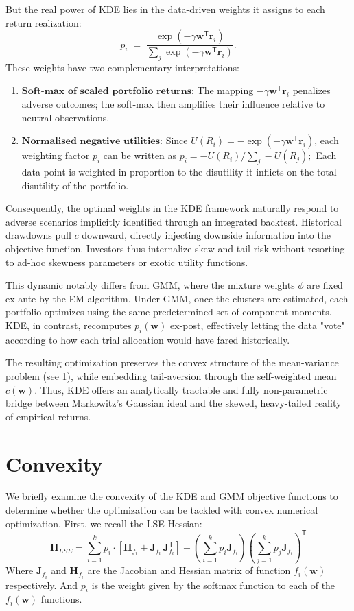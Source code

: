 But the real power of KDE lies in the data-driven weights it assigns to each return realization:
$$p_i \;=\; \frac{\exp\!\left(-\gamma\mathbf{w}^{\mathsf{T}}\mathbf{r}_{i}\right)} {\sum_j \exp\!\left(-\gamma\mathbf{w}^{\mathsf{T}}\mathbf{r}_{i}\right)}.$$
These weights have two complementary interpretations:
\begin{enumerate}
\item $\textbf{Soft-max of scaled portfolio returns}$: The mapping $-\gamma\mathbf{w}^{\mathsf{T}}\mathbf{r}_{i}$ penalizes adverse outcomes; the soft-max then amplifies their influence relative to neutral observations.
\item $\textbf{Normalised negative utilities}$: Since $U(R_i)=-\exp(-\gamma\mathbf{w}^{\mathsf{T}}\mathbf{r}_{i})$, each weighting factor $p_i$ can be written as $p_i=-U(R_i)\bigl/\sum_j -U(R_j);$
Each data point is weighted in proportion to the disutility it inflicts on the total disutility of the portfolio.
\end{enumerate}

Consequently, the optimal weights in the KDE framework naturally respond to adverse scenarios implicitly identified through an integrated backtest. Historical drawdowns pull $c$ downward, directly injecting downside information into the objective function. Investors thus internalize skew and tail-risk without resorting to ad-hoc skewness parameters or exotic utility functions.

This dynamic notably differs from GMM, where the mixture weights $\phi$ are fixed ex-ante by the EM algorithm. Under GMM, once the clusters are estimated, each portfolio optimizes using the same predetermined set of component moments. KDE, in contrast, recomputes $p_i(\mathbf w)$ ex-post, effectively letting the data "vote" according to how each trial allocation would have fared historically.

The resulting optimization preserves the convex structure of the mean-variance problem (see \ref{sec:convexity}), while embedding tail-aversion through the self-weighted mean $c(\mathbf w)$. Thus, KDE offers an analytically tractable and fully non-parametric bridge between Markowitz's Gaussian ideal and the skewed, heavy-tailed reality of empirical returns.

\section{Convexity}
\label{sec:convexity}
We briefly examine the convexity of the KDE and GMM objective functions to determine whether the optimization can be tackled with convex numerical optimization. First, we recall the LSE Hessian:
$$\mathbf{H}_{LSE}=\sum_{i=1}^{k}p_i\cdot\left[\mathbf{H}_{f_i}+\mathbf{J}_{f_i}^{}\,\mathbf{J}_{f_i}^{\mathsf{T}}\right]-\left(\sum_{i=1}^{k}p_i\mathbf{J}_{f_i}\right)\left(\sum_{j=1}^{k}p_j\mathbf{J}_{f_i}\right)^{\mathsf{T}}$$
Where $\mathbf{J}_{f_i}$ and $\mathbf{H}_{f_i}$ are the Jacobian and Hessian matrix of function $f_i(\mathbf{w})$ respectively. And $p_i$ is the weight given by the softmax function to each of the $f_i(\mathbf{w})$ functions.

